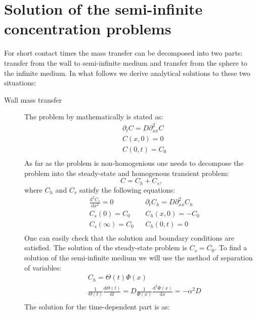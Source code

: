 \documentclass{article}
\begin{document}
\section{Solution of the semi-infinite concentration problems}
\label{mass:transfer:correlation}
For short contact times the mass transfer can be decomposed into two parts: transfer from the wall
to semi-infinite medium and transfer from the sphere to the infinite medium. In what follows we
derive analytical solutions to these two situations:
\begin{description}
\item[Wall mass transfer] The problem by mathematically is stated as:
\begin{equation}
\begin{aligned}
&\partial_t C =D \partial^2_{xx} C\\
&C(x,0)=0\\
&C(0,t)=C_0\\
\end{aligned}
\end{equation}
As far as the problem is non-homogenious one needs to decompose the problem into the steady-state
and homogenous transient problem:
\begin{equation}
C=C_h + C_s,
\end{equation}
where $C_h$ and $C_s$ satisfy the following equations:
\begin{equation}
\begin{aligned}
&\frac{\mathrm{d^2} C_s}{\mathrm{d}x^2}=0 && \partial_t C_h=D\partial^2_{xx} C_h\\
&C_s(0)=C_0 && C_h(x,0)=-C_0\\
&C_s(\infty)=C_0 && C_h(0,t)=0\\
\end{aligned}
\end{equation}
One can easily check that the solution and boundary conditions are satisfied. The solution of
the steady-state problem is $C_s=C_0$. To find a solution of the semi-infinite medium we will use
the method of separation of variables:
\begin{equation}
\begin{aligned}
&C_h=\Theta(t)\Phi(x)\\
&\frac{1}{\Theta(t)}\frac{\mathrm{d}\Theta(t)}{\mathrm{d}t}=D
\frac{1}{\Phi(x)}\frac{\mathrm{d}^2\Phi(x)}{\mathrm{d}x}=-\alpha^2 D\\
\end{aligned}
\end{equation}
The solution for the time-dependent part is as:

\end{description}
\end{document}
